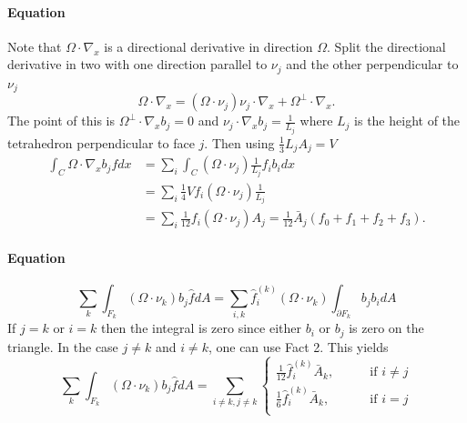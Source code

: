 \documentclass[12pt,letterpaper]{article}
\begin{document}
\paragraph{Equation}
Note that $\Omega \cdot \nabla_x$ is a directional derivative in direction $\Omega$.
Split the directional derivative in two with one direction parallel to $\nu_j$ and the other perpendicular to $\nu_j$
\begin{equation}
\Omega \cdot \nabla_x = (\Omega \cdot \nu_j) \nu_j \cdot \nabla_x + \Omega^\perp \cdot \nabla_x.
\end{equation}
The point of this is $\Omega^\perp \cdot \nabla_x b_j = 0$ and $\nu_j \cdot \nabla_x b_j = \frac{1}{L_j}$ where $L_j$ is the height of the tetrahedron perpendicular to face $j$.
Then using $\frac{1}{3} L_j A_j = V$
\begin{align}
\int_C \Omega \cdot \nabla_x b_j f dx &= \sum_i \int_C (\Omega \cdot \nu_j) \frac{1}{L_j} f_i b_i dx \\
&= \sum_i \frac{1}{4} V f_i (\Omega \cdot \nu_j) \frac{1}{L_j} \\
&= \sum_i \frac{1}{12} f_i (\Omega \cdot \nu_j) A_j = \frac{1}{12} \bar{A}_j (f_0 + f_1 + f_2 + f_3).
\end{align}

\paragraph{Equation}
\begin{equation}
\sum_k \int_{F_k} (\Omega \cdot \nu_k) b_j \hat{f} dA = \sum_{i,k} \hat{f}^{(k)}_i (\Omega \cdot \nu_k) \int_{\partial F_k} b_j b_i dA
\end{equation}
If $j = k$ or $i = k$ then the integral is zero since either $b_i$ or $b_j$ is zero on the triangle.
In the case $j \neq k$ and $i \neq k$, one can use Fact 2.
This yields
\begin{equation}
\sum_k \int_{F_k} (\Omega \cdot \nu_k) b_j \hat{f} dA = \sum_{i \neq k, j \neq k} \begin{cases}
\frac{1}{12} \hat{f}^{(k)}_i \bar{A}_k, \qquad &\textrm{if } i \neq j \\
\frac{1}{6} \hat{f}^{(k)}_i \bar{A}_k, \qquad &\textrm{if } i = j \\
\end{cases}
\end{equation}
\end{document}
